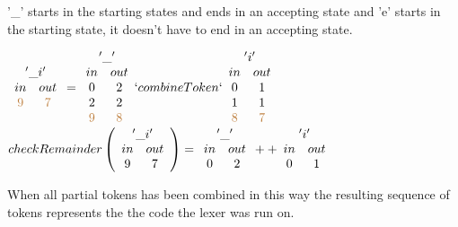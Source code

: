 \begin{example}\label{remToken}
'\_' starts in the starting states and ends in an accepting state and 'e' starts
in the starting state, it doesn't have to end in an accepting state.
\begin{center}
$\begin{array}{cc}\multicolumn{2}{c}{'\_i'}\\
in & out\\
\textcolor{brown}{9} & \textcolor{brown}{7}\\
\end{array}
=
\begin{array}{cc}\multicolumn{2}{c}{'\_'}\\
in & out\\
0 & 2\\
2 & 2\\
\textcolor{brown}{9} & \textcolor{brown}{8}\\
\end{array}
`combineToken`
\begin{array}{cc}
\multicolumn{2}{c}{'i'}\\
in & out\\
0 & 1\\
1 & 1\\
\textcolor{brown}{8} & \textcolor{brown}{7}\\
\end{array}$\\
$checkRemainder \left(\begin{array}{cc}\multicolumn{2}{c}{'\_i'}\\
in & out\\
9 & 7\\
\end{array} \right)
=
\begin{array}{cc}\multicolumn{2}{c}{'\_'}\\
in & out\\
0 & 2\\
\end{array} ++
\begin{array}{cc}\multicolumn{2}{c}{'i'}\\
in & out\\
0 & 1\\
\end{array}$\\
\end{center}
\end{example}
When all partial tokens has been combined in this way the resulting sequence of
tokens represents the the code the lexer was run on.



